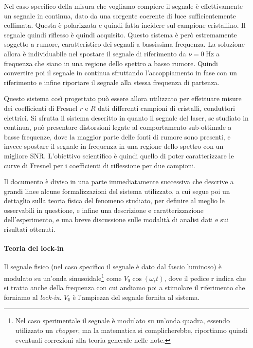\documentclass[prb,showpacs,floatfix,altaffilletter,amsmath,amssymb,reprint,citeautoscript]{revtex4-1}
\begin{document}
Nel caso specifico della misura che vogliamo compiere il segnale è effettivamente un segnale in continua, dato da una sorgente coerente di luce sufficientemente collimata. Questa è polarizzata e quindi fatta incidere sul campione cristallino. Il segnale quindi riflesso è quindi acquisito. Questo sistema è però estremamente soggetto a rumore, caratteristico dei segnali a bassissima frequenza. La soluzione allora è individuabile nel spostare il segnale di riferimento da $\nu=\SI{0}{\Hz}$ a frequenza che siano in una regione dello spettro a basso rumore. Quindi convertire poi il segnale in continua sfruttando l'accoppiamento in fase con un riferimento e infine riportare il segnale alla stessa frequenza di partenza. 

Questo sistema così progettato può essere allora utilizzato per effettuare misure dei coefficienti di Fresnel\cite{fresnelCalculationTintsThat2021,fresnelNoteCalculTeintes1821} $r$ e $R$ dati differenti campioni di cristalli, conduttori elettrici. Si sfrutta il sistema descritto in quanto il segnale del laser, se studiato in continua, può presentare distorsioni legate al comportamento sub-ottimale a basse frequenze, dove la maggior parte delle fonti di rumore sono presenti, e invece spostare il segnale in frequenza in una regione dello spettro con un migliore SNR. L'obiettivo scientifico è quindi quello di poter caratterizzare le curve di Fresnel per i coefficienti di riflessione per due campioni. 

Il documento è diviso in una parte immediatamente successiva che descrive a grandi linee alcune formalizzazioni del sistema utilizzato, a cui segue poi un dettaglio sulla teoria fisica del fenomeno studiato, per definire al meglio le osservabili in questione, e infine una descrizione e caratterizzazione dell'esperimento, e una breve discussione sulle modalità di analisi dati e sui risultati ottenuti. 

\paragraph*{Teoria del lock-in} 
Il segnale fisico (nel caso specifico il segnale è dato dal fascio luminoso) è modulato su un'onda sinusoidale\footnote{Nel caso sperimentale il segnale è modulato su un'onda quadra, essendo utilizzato un \emph{chopper}, ma la matematica si complicherebbe, riportiamo quindi eventuali correzioni alla teoria generale nelle note.} come $V_0 \cos(\omega_\mathrm{r} t)$, dove il pedice r indica che si tratta anche della frequenza con cui andiamo poi a stimolare il riferimento che forniamo al \emph{lock-in}. $V_0$ è l'ampiezza del segnale fornita al sistema. 
\end{document}
